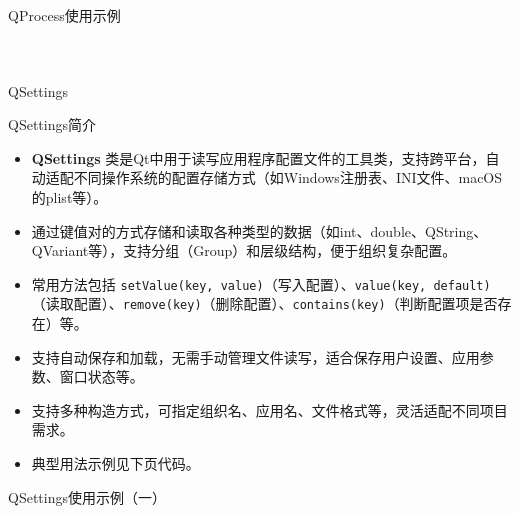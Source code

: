\documentclass[UTF8,aspectratio=169]{beamer}
\begin{document}
\begin{frame}[fragile]{QProcess使用示例}
    \begin{columns}
        \begin{column}{0.48\textwidth}
            \inputminted[firstline=1,lastline=21]{cpp}{code/qt_process_example.cpp}
        \end{column}
        \begin{column}{0.48\textwidth}
            \inputminted[firstline=22,lastline=40]{cpp}{code/qt_process_example.cpp}
        \end{column}
    \end{columns}
\end{frame}

\begin{frame}{QSettings}
    \begin{ytublock}{QSettings简介}
        \begin{itemize}
            \item \textbf{QSettings} 类是Qt中用于读写应用程序配置文件的工具类，支持跨平台，自动适配不同操作系统的配置存储方式（如Windows注册表、INI文件、macOS的plist等）。
            \item 通过键值对的方式存储和读取各种类型的数据（如int、double、QString、QVariant等），支持分组（Group）和层级结构，便于组织复杂配置。
            \item 常用方法包括 \texttt{setValue(key, value)}（写入配置）、\texttt{value(key, default)}（读取配置）、\texttt{remove(key)}（删除配置）、\texttt{contains(key)}（判断配置项是否存在）等。
            \item 支持自动保存和加载，无需手动管理文件读写，适合保存用户设置、应用参数、窗口状态等。
            \item 支持多种构造方式，可指定组织名、应用名、文件格式等，灵活适配不同项目需求。
            \item 典型用法示例见下页代码。
        \end{itemize}
    \end{ytublock}
\end{frame}

\begin{frame}[fragile]{QSettings使用示例（一）}
    \begin{columns}
        \begin{column}{0.48\textwidth}
            \inputminted[firstline=1,lastline=16]{cpp}{code/qt_settings_example.cpp}
        \end{column}
        \begin{column}{0.48\textwidth}
            \inputminted[firstline=17,lastline=32]{cpp}{code/qt_settings_example.cpp}
        \end{column}
    \end{columns}
\end{frame}
\end{document}
